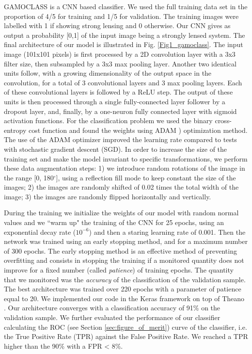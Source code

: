 \documentclass{aa}
\newcommand{\degree}{^{\circ}}
\begin{document}
GAMOCLASS is a CNN based classifier.
We used the full training data set in the proportion of 4/5 for training and 1/5 for validation. The training images were labelled with 1 if showing strong lensing and 0 otherwise. Our CNN gives as output a probability [0,1] of the input image being a strongly lensed system.
The final architecture of our model is illustrated in Fig. \ref{Fig1_gamoclass}. The input image (101x101 pixels) is first processed by a 2D convolution layer with a 3x3 filter size, then subsampled by a 3x3 max pooling layer.  Another two identical units follow, with a growing dimensionality of the output space %
 in the convolution, for a total of 3 convolutional layers and 3 max
 pooling layers. Each of these convolutional layers is followed by a ReLU step. The output of these units is then processed through a single fully-connected layer follower by a dropout layer, and, finally, by a one-neuron fully connected layer with sigmoid activation functions. For the classification problem we used the binary cross-entropy cost function and found the weights  using ADAM \citep{Kingma_2014}) optimization method. The use of the ADAM optimizer improved the learning rate compared to tests with stochastic gradient descent (SGD).
In order to increase the size of the training set and make the model invariant to specific transformations, we perform these data augmentation steps:
1) we introduce random rotations of the image in the range [0, 180$\degree$], using a reflection fill mode to keep constant the size of the images;
2) the images are randomly shifted of 0.02 times the total width of the image;
3) the images are randomly flipped horizontally and vertically.

During the training we initialize the weights of our model with random normal values and we ``warm up" the training of the CNN for 25 epochs, using an exponential decay rate ($10^{-6}$) \citep{Huang_2016}  and then a staring learning rate of  0.001. Then the network was trained using an early stopping method, and for a maximum number of 300 epochs. The early stopping method is an effective method of preventing overfitting and consists in stopping the training if a monitored quantity does not improve for a fixed number (called \textit{patience}) of training epochs. The quantity that we monitored was the \textit{accuracy} of the classification of the validation sample. The best architecture was trained over 220 epochs with a parameter of patience equal to 20.
We implemented our code in the Keras framework \citep{Chollet_2015} on top of Theano \citep{Bastien_2012}.
Our architecture converges with a classification accuracy of 91\% on the validation sample. We further evaluated the performance of our classifier calculating the ROC (see Section \ref{sec:figure_of_merit})  curve of the classifier, i.e. the True Positive Rate (TPR) against the False Positive Rate.  We reached a TPR higher than the 90\% with a FPR < 8\%.
\end{document}
